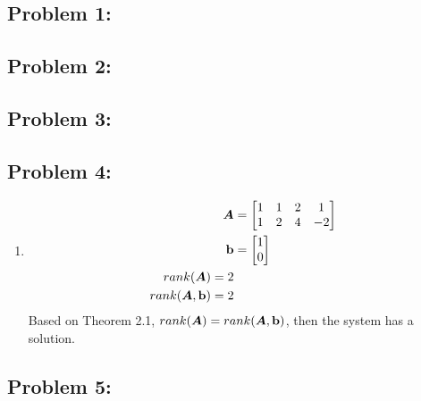 \documentclass{article}
\begin{document}
 

\hypertarget{}{}
\subsection*{{Problem 1: }}
\label{}


\hypertarget{}{}
\subsection*{{Problem 2: }}
\label{}


\hypertarget{}{}
\subsection*{{Problem 3: }}
\label{}

\hypertarget{}{}
\subsection*{{Problem 4: }}
\label{}
\begin{enumerate} 
\item 
\begin{align} 
\boldsymbol{A} &= \begin{bmatrix} 1 & 1 & 2 & 1 \\ 1 & 2 & 4 & -2  \end{bmatrix}  \\ 
\boldsymbol{\mathrm{b}} &= \begin{bmatrix} 1 \\ 0  \end{bmatrix}  \\
rank(\boldsymbol{A}) = 2 \\
rank(\boldsymbol{A}, \boldsymbol{\mathrm{b}}) = 2 \\
\end{align} 
Based on Theorem 2.1, $rank(\boldsymbol{A}) = rank(\boldsymbol{A},\boldsymbol{\mathrm{b}}) $, then the system has a solution. 
\end{enumerate}



\hypertarget{}{}
\subsection*{{Problem 5: }}
\label{}

\hypertarget{}{}
\end{document}
